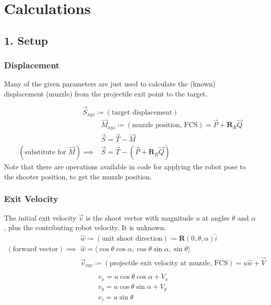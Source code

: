\documentclass{article}
\begin{document}
\section*{Calculations}

\subsection*{1. Setup}

\subsubsection*{Displacement}
Many of the given parameters are just used to calculate the (known) displacement (muzzle) from the projectile exit point to the target.

\[ \vec{S}_{xyz}\coloneqq(\text{target displacement}) \]
\begin{align*}
    &\vec{M}_{xyz}\coloneqq(\text{muzzle position, FCS})=\vec{P}+\boldsymbol{R}_R\vec{Q} \\
    &\vec{S}=\vec{T}-\vec{M} \\
    (\text{substitute for }\vec{M})\implies&\vec{S}=\vec{T}-(\vec{P}+\boldsymbol{R}_R\vec{Q})
\end{align*}
Note that there are operations available in code for applying the robot pose to the shooter position, to get the muzzle position.

\subsubsection*{Exit Velocity}
The initial exit velocity $\vec{v}$ is the shoot vector with magnitude $u$ at angles $\theta$ and $\alpha$, plus the contributing robot velocity. It is unknown.
\begin{align*}
    &\hat{w}\coloneqq(\text{unit shoot direction})\coloneqq\boldsymbol{R}(0,\theta,\alpha)\hat{i} \\
    (\text{forward vector})\implies&\hat{w}=\langle\cos\theta\cos\alpha,\cos\theta\sin\alpha,\sin\theta\rangle \\
    &\vec{v}_{xyz}\coloneqq(\text{projectile exit velocity at muzzle, FCS})=u\hat{w}+\vec{V} \\
\end{align*}
\begin{align*}
    &v_x=u\cos\theta\cos\alpha+V_x \\
    &v_y=u\cos\theta\sin\alpha+V_y \\
    &v_z=u\sin\theta \\
\end{align*}
\end{document}

